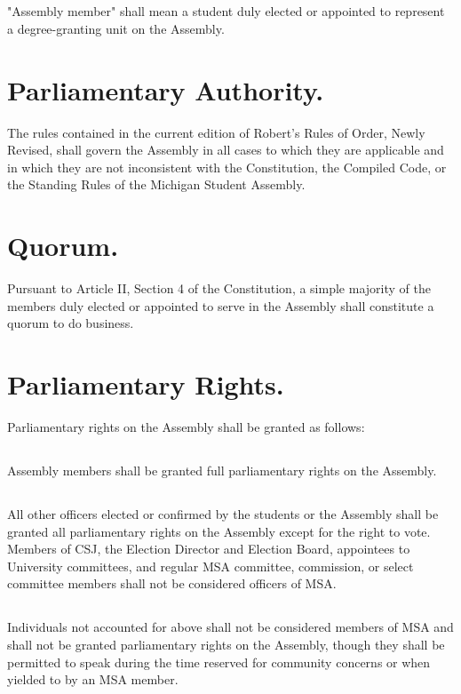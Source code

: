 \documentclass{rules}
\begin{document}
\subsection{}
"Assembly member" shall mean a student duly elected or appointed to represent a degree-granting unit on the Assembly.

\section{Parliamentary Authority.}
The rules contained in the current edition of Robert's Rules of Order, Newly Revised, shall govern the Assembly in all cases to which they are applicable and in which they are not inconsistent with the Constitution, the Compiled Code, or the Standing Rules of the Michigan Student Assembly.

\section{Quorum.}
Pursuant to Article II, Section 4 of the Constitution, a simple majority of the members duly elected or appointed to serve in the Assembly shall constitute a quorum to do business.

\section{Parliamentary Rights.}
Parliamentary rights on the Assembly shall be granted as follows:
\subsection{}
Assembly members shall be granted full parliamentary rights on the Assembly.
\subsection{}
All other officers elected or confirmed by the students or the Assembly shall be granted all parliamentary rights on the Assembly except for the right to vote. Members of CSJ, the Election Director and Election Board, appointees to University committees, and regular MSA committee, commission, or select committee members shall not be considered officers of MSA.
\subsection{}
Individuals not accounted for above shall not be considered members of MSA and shall not be granted parliamentary rights on the Assembly, though they shall be permitted to speak during the time reserved for community concerns or when yielded to by an MSA member.
\end{document}
